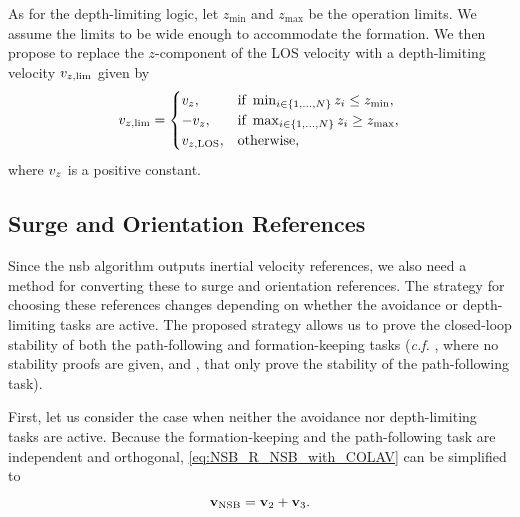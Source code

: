 As for the depth-limiting logic,
let $z_{\min}$ and $z_{\max}$ be the operation limits.
We assume the limits to be wide enough to accommodate the formation.
We then propose to replace the $z$-component of the LOS velocity with a depth-limiting velocity $v_{z, {\rm lim}}$ given by 
\begin{equation}
    v_{z, {\rm lim}} = \begin{cases}
        v_z, & \text{if } \min_{i \in \{1, \ldots, N\}} z_i \leq z_{\min}, \\
        -v_z, & \text{if } \max_{i \in \{1, \ldots, N\}} z_i \geq z_{\max}, \\
        v_{z, {\rm LOS}}, & \text{otherwise},
    \end{cases}
\end{equation}
where $v_z$ is a positive constant.


\subsection{Surge and Orientation References}
\label{sec:NSB_R_references}

Since the \gls{nsb} algorithm outputs inertial velocity references, we also need a method for converting these to surge and orientation references.
The strategy for choosing these references changes depending on whether the avoidance or depth-limiting tasks are active.
The proposed strategy allows us to prove the closed-loop stability of both the path-following and formation-keeping tasks (\emph{c.f.} \cite{arrichiello_formation_2006}, where no stability proofs are given, and \cite{eek_formation_2021,matouvs_formation_2022}, that only prove the stability of the path-following task).



First, let us consider the case when neither the avoidance nor depth-limiting tasks are active.
Because the formation-keeping and the path-following task are independent and orthogonal, \eqref{eq:NSB_R_NSB_with_COLAV} can be simplified to 
\begin{equation}
    \mathbf{v}_{\rm NSB} = \mathbf{v}_2 + \mathbf{v}_3.
    \label{eq:NSB_R_NSB_nominal_simplified}
\end{equation}


